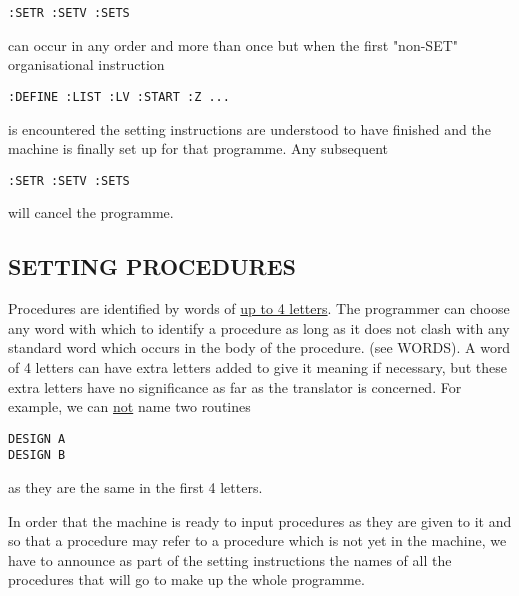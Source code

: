 \documentclass[10pt, a4paper, oneside]{article}
\newcommand{\myuline}[1]{\uline{#1}}
\begin{document}
\begin{multicols}{2}
\begin{addmargin}[1cm]{1em}%
\begin{lstlisting}
:SETR :SETV :SETS
\end{lstlisting}
\end{addmargin}

can occur in any order and more than
once but when the first "non-SET" organisational
instruction

\begin{addmargin}[1cm]{1em}%
\begin{lstlisting}
:DEFINE :LIST :LV :START :Z ...
\end{lstlisting}
\end{addmargin}

is encountered the setting instructions are understood
to have finished and the machine is finally set up
for that programme.  Any subsequent

\begin{addmargin}[1cm]{1em}%
\begin{lstlisting}
:SETR :SETV :SETS
\end{lstlisting}
\end{addmargin}

will cancel the programme.

\subsection{SETTING PROCEDURES}

Procedures are identified by words of \myuline{up to 4
letters}.  The programmer can choose any word with
which to identify a procedure as long as it does
not clash with any standard word which occurs in the
body of the procedure.  (see WORDS).  A word of 4
letters can have extra letters added to give it
meaning if necessary, but these extra letters have no
significance as far as the translator is concerned.
For example, we can \myuline{not} name two routines

\begin{addmargin}[1cm]{1em}%
\begin{lstlisting}
DESIGN A
DESIGN B
\end{lstlisting}
\end{addmargin}

\begin{flushleft}
as they are the same in the first 4 letters.
\end{flushleft}

In order that the machine is ready to input
procedures as they are given to it and so that a
procedure may refer to a procedure which is not yet
in the machine, we have to announce as part of the
setting instructions the names of all the procedures
that will go to make up the whole programme.


\end{multicols}
\end{document}
